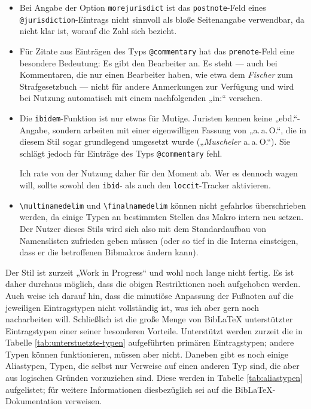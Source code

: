 \documentclass[11pt,a4paper,DIV=calc]{scrartcl}
\newcommand\software[1]{\textsf{#1}}
\newcommand\Biblatex{\software{Bib\LaTeX{}}\xspace}
\begin{document}
\begin{itemize}
\item Bei Angabe der Option \verb+morejurisdict+ ist das
  \verb+postnote+-Feld eines \verb+@jurisdiction+-Eintrags nicht
  sinnvoll als bloße Seitenangabe verwendbar, da nicht klar ist,
  worauf die Zahl sich bezieht.
\item Für Zitate aus Einträgen des Typs \verb+@commentary+ hat das
  \verb+prenote+-Feld eine besondere Bedeutung: Es gibt den Bearbeiter
  an. Es steht — auch bei Kommentaren, die nur einen Bearbeiter haben,
  wie etwa dem \emph{Fischer} zum Strafgesetzbuch — nicht für andere
  Anmerkungen zur Verfügung und wird bei Nutzung automatisch mit einem
  nachfolgenden „in:“ versehen.
\item Die \verb+ibidem+-Funktion ist nur etwas für Mutige. Juristen
  kennen keine „ebd.“-Angabe, sondern arbeiten mit einer eigenwilligen
  Fassung von „a.\,a.\,O.“, die in diesem Stil sogar grundlegend umgesetzt
  wurde („\textit{Muscheler} a.\,a.\,O.“). Sie schlägt jedoch für Einträge
  des Typs \verb+@commentary+ fehl.

  Ich rate von der Nutzung daher für den Moment ab. Wer es dennoch
  wagen will, sollte sowohl den \verb+ibid+- als auch den
  \verb+loccit+-Tracker aktivieren.
\item \verb+\multinamedelim+ und \verb+\finalnamedelim+ können nicht
  gefahrlos überschrieben werden, da einige Typen an bestimmten
  Stellen das Makro intern neu setzen. Der Nutzer dieses Stils wird
  sich also mit dem Standardaufbau von Namenslisten zufrieden geben
  müssen (oder so tief in die Interna einsteigen, dass er die
  betroffenen Bibmakros ändern kann).
\end{itemize}

Der Stil ist zurzeit „Work in Progress“ und wohl noch lange nicht
fertig. Es ist daher durchaus möglich, dass die obigen Restriktionen
noch aufgehoben werden. Auch weise ich darauf hin, dass die minutiöse
Anpassung der Fußnoten auf die jeweiligen Eintragstypen nicht
vollständig ist, was ich aber gern noch nacharbeiten will. Schließlich
ist die große Menge von \Biblatex unterstützter Eintragstypen einer
seiner besonderen Vorteile. Unterstützt werden zurzeit die in Tabelle
\ref{tab:unterstuetzte-typen} aufgeführten primären Eintragstypen;
andere Typen können funktionieren, müssen aber nicht. Daneben gibt es
noch einige Aliastypen, \dh Typen, die selbst nur Verweise auf einen
anderen Typ sind, die aber aus logischen Gründen vorzuziehen
sind. Diese werden in Tabelle \ref{tab:aliastypen} aufgelistet; für
weitere Informationen diesbezüglich sei auf die
\Biblatex-Do\-ku\-men\-ta\-tion verweisen.
\end{document}
